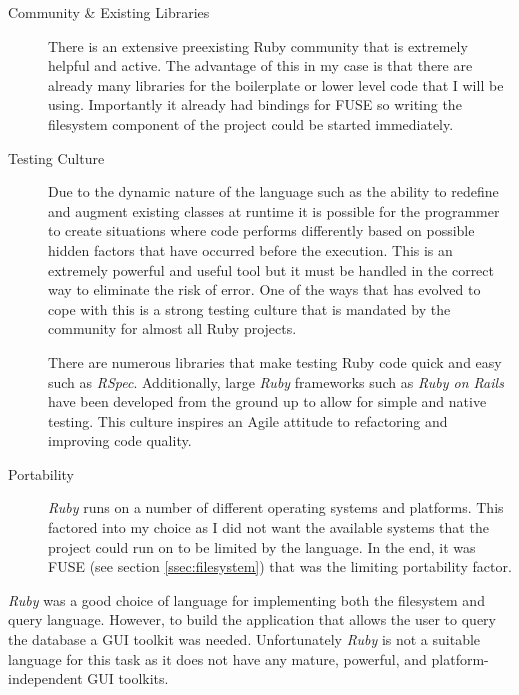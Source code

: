 \begin{description}

\item[Community \& Existing Libraries] \hfill

There is an extensive preexisting Ruby community that is extremely helpful and
active. The advantage of this in my case is that there are already many
libraries for the boilerplate or lower level code that I will be using.
Importantly it already had bindings for \ac{FUSE} so writing the filesystem
component of the project could be started immediately.

\item[Testing Culture] \hfill

Due to the dynamic nature of the language such as the ability to redefine and
augment existing classes at runtime it is possible for the programmer to create
situations where code performs differently based on possible hidden factors
that have occurred before the execution. This is an extremely powerful and
useful tool but it must be handled in the correct way to eliminate the risk of
error. One of the ways that has evolved to cope with this is a strong testing
culture that is mandated by the community for almost all Ruby projects.

There are numerous libraries that make testing Ruby code quick and easy such as
\emph{RSpec}. Additionally, large \emph{Ruby} frameworks such as \emph{Ruby on
Rails} have been developed from the ground up to allow for simple and native
testing. This culture inspires an Agile attitude to refactoring and improving
code quality.

\item[Portability] \hfill

\emph{Ruby} runs on a number of different operating systems and platforms. This
factored into my choice as I did not want the available systems that the
project could run on to be limited by the language. In the end, it was
\ac{FUSE} (see section \ref{ssec:filesystem}) that was the limiting portability
factor.

\end{description}

\emph{Ruby} was a good choice of language for implementing both the filesystem
and query language. However, to build the application that allows the user to
query the database a GUI toolkit was needed. Unfortunately \emph{Ruby} is not
a suitable language for this task as it does not have any mature, powerful,
and platform-independent GUI toolkits.

